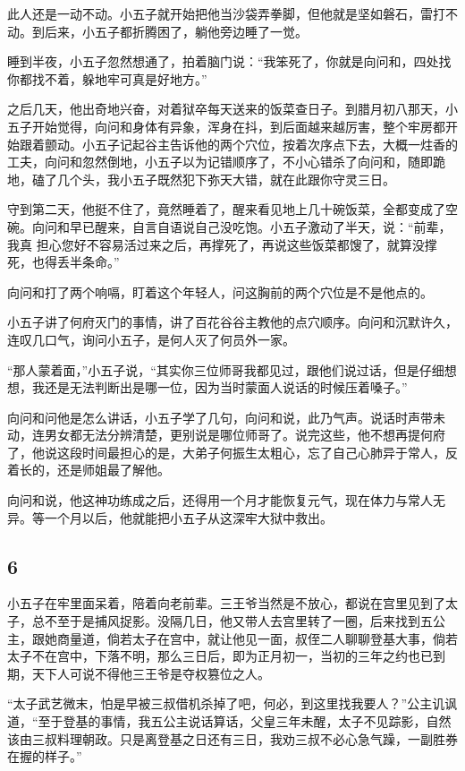 此人还是一动不动。小五子就开始把他当沙袋弄拳脚，但他就是坚如磐石，雷打不动。到后来，小五子都折腾困了，躺他旁边睡了一觉。

睡到半夜，小五子忽然想通了，拍着脑门说：“我笨死了，你就是向问和，四处找你都找不着，躲地牢可真是好地方。”

之后几天，他出奇地兴奋，对着狱卒每天送来的饭菜查日子。到腊月初八那天，小五子开始觉得，向问和身体有异象，浑身在抖，到后面越来越厉害，整个牢房都开始跟着颤动。小五子记起谷主告诉他的两个穴位，按着次序点下去，大概一炷香的工夫，向问和忽然倒地，小五子以为记错顺序了，不小心错杀了向问和，随即跪地，磕了几个头，我小五子既然犯下弥天大错，就在此跟你守灵三日。

守到第二天，他挺不住了，竟然睡着了，醒来看见地上几十碗饭菜，全都变成了空碗。向问和早已醒来，自言自语说自己没吃饱。小五子激动了半天，说：“前辈，我真
担心您好不容易活过来之后，再撑死了，再说这些饭菜都馊了，就算没撑死，也得丢半条命。”

向问和打了两个响嗝，盯着这个年轻人，问这胸前的两个穴位是不是他点的。

小五子讲了何府灭门的事情，讲了百花谷谷主教他的点穴顺序。向问和沉默许久，连叹几口气，询问小五子，是何人灭了何员外一家。

“那人蒙着面，”小五子说，“其实你三位师哥我都见过，跟他们说过话，但是仔细想想，我还是无法判断出是哪一位，因为当时蒙面人说话的时候压着嗓子。”

向问和问他是怎么讲话，小五子学了几句，向问和说，此乃气声。说话时声带未动，连男女都无法分辨清楚，更别说是哪位师哥了。说完这些，他不想再提何府了，他说这段时间最担心的是，大弟子何振生太粗心，忘了自己心肺异于常人，反着长的，还是师姐最了解他。

向问和说，他这神功练成之后，还得用一个月才能恢复元气，现在体力与常人无异。等一个月以后，他就能把小五子从这深牢大狱中救出。
\newline

{\centering\subsection{6}}

小五子在牢里面呆着，陪着向老前辈。三王爷当然是不放心，都说在宫里见到了太子，总不至于是捕风捉影。没隔几日，他又带人去宫里转了一圈，后来找到五公主，跟她商量道，倘若太子在宫中，就让他见一面，叔侄二人聊聊登基大事，倘若太子不在宫中，下落不明，那么三日后，即为正月初一，当初的三年之约也已到期，天下人可说不得他三王爷是夺权篡位之人。

“太子武艺微末，怕是早被三叔借机杀掉了吧，何必，到这里找我要人？”公主讥讽道，“至于登基的事情，我五公主说话算话，父皇三年未醒，太子不见踪影，自然该由三叔料理朝政。只是离登基之日还有三日，我劝三叔不必心急气躁，一副胜券在握的样子。”

